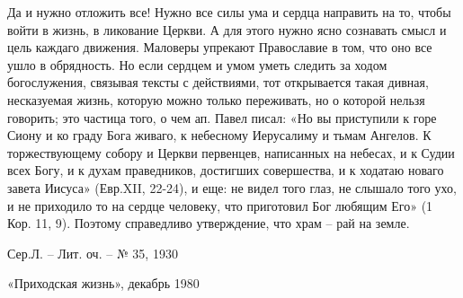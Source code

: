 Да и нужно отложить все! Нужно все силы ума и сердца направить на то, чтобы войти в жизнь, в ликование Церкви. А для этого нужно ясно сознавать смысл и цель каждаго движения. Маловеры упрекают Православие в том, что оно все ушло в обрядность. Но если сердцем и умом уметь следить за ходом богослужения, связывая тексты с действиями, тот открывается такая дивная, несказуемая жизнь, которую можно только переживать, но о которой нельзя говорить; это частица того, о чем ап. Павел писал: «Но вы приступили к горе Сиону и ко граду Бога живаго, к небесному Иерусалиму и тьмам Ангелов. К торжествующему собору и Церкви первенцев, написанных на небесах, и к Судии всех Богу, и к духам праведников, достигших совершества, и к ходатаю новаго завета Иисуса» (Евр.XII, 22-24), и еще: не видел того глаз, не слышало того ухо, и не приходило то на сердце человеку, что приготовил Бог любящим Его» (1 Кор. 11, 9). Поэтому справедливо утверждение, что храм – рай на земле.

Сер.Л. – Лит. оч. – № 35, 1930

«Приходская жизнь», декабрь 1980

 


\mychapterending